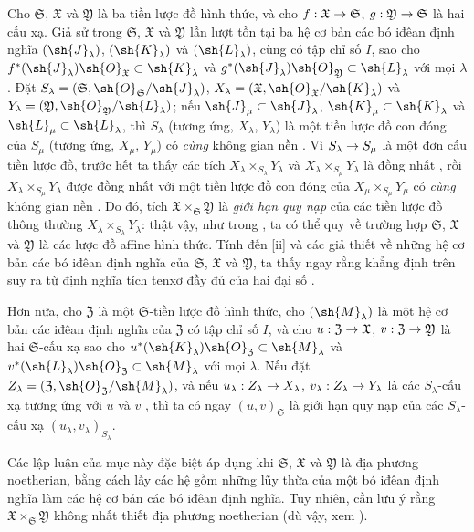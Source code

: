 \documentclass[oneside]{amsart}
\makeatletter
\newcommand{\ega@arrow}[2]{\mathchoice{#1}{#2}{#2}{#2}}
\renewcommand{\to}{\ega@arrow{\longrightarrow}{\rightarrow}}
\newcommand{\oldpage}[2][]{{\marginnote{\normalfont\textbf{#1}~|~#2}}\ignorespaces}
\let\EGAOriginalLabel\label
\renewcommand{\label}[1]{\phantomsection\EGAOriginalLabel{#1}}
\makeatother
\begin{document}
\begin{env}[10.7.4]
\label{I.10.7.4}
Cho $\mathfrak{S}$, $\mathfrak{X}$ và $\mathfrak{Y}$ là ba tiền lược đồ hình thức, và cho $f:\mathfrak{X}\to\mathfrak{S}$, $g:\mathfrak{Y}\to\mathfrak{S}$ là hai cấu xạ.
Giả sử trong $\mathfrak{S}$, $\mathfrak{X}$ và $\mathfrak{Y}$ lần lượt tồn tại ba hệ cơ bản các bó iđêan định nghĩa $(\sh{J}_\lambda)$, $(\sh{K}_\lambda)$ và $(\sh{L}_\lambda)$, cùng có tập chỉ số $I$, sao cho $f^*(\sh{J}_\lambda)\sh{O}_\mathfrak{X}\subset\sh{K}_\lambda$ và $g^*(\sh{J}_\lambda)\sh{O}_\mathfrak{Y}\subset\sh{L}_\lambda$ với mọi $\lambda$.
Đặt $S_\lambda=(\mathfrak{S},\sh{O}_\mathfrak{S}/\sh{J}_\lambda)$, $X_\lambda=(\mathfrak{X},\sh{O}_\mathfrak{X}/\sh{K}_\lambda)$ và $Y_\lambda=(\mathfrak{Y},\sh{O}_\mathfrak{Y}/\sh{L}_\lambda)$; nếu $\sh{J}_\mu\subset\sh{J}_\lambda$, $\sh{K}_\mu\subset\sh{K}_\lambda$ và $\sh{L}_\mu\subset\sh{L}_\lambda$, thì $S_\lambda$ (tương ứng, $X_\lambda$, $Y_\lambda$) là một tiền lược đồ con đóng của $S_\mu$ (tương ứng, $X_\mu$, $Y_\mu$) có \emph{cùng}
\oldpage[I]{194}
không gian nền .
Vì $S_\lambda\to S_\mu$ là một đơn cấu tiền lược đồ, trước hết ta thấy các tích $X_\lambda\times_{S_\lambda}Y_\lambda$ và $X_\lambda\times_{S_\mu}Y_\lambda$ là đồng nhất , rồi $X_\lambda\times_{S_\mu}Y_\lambda$ được đồng nhất với một tiền lược đồ con đóng của $X_\mu\times_{S_\mu}Y_\mu$ có \emph{cùng} không gian nền .
Do đó, tích $\mathfrak{X}\times_\mathfrak{S}\mathfrak{Y}$ là \emph{giới hạn quy nạp} của các tiền lược đồ thông thường $X_\lambda\times_{S_\lambda}Y_\lambda$: thật vậy, như trong , ta có thể quy về trường hợp $\mathfrak{S}$, $\mathfrak{X}$ và $\mathfrak{Y}$ là các lược đồ affine hình thức.
Tính đến [ii] và các giả thiết về những hệ cơ bản các bó iđêan định nghĩa của $\mathfrak{S}$, $\mathfrak{X}$ và $\mathfrak{Y}$, ta thấy ngay rằng khẳng định trên suy ra từ định nghĩa tích tenxơ đầy đủ của hai đại số .

Hơn nữa, cho $\mathfrak{Z}$ là một $\mathfrak{S}$-tiền lược đồ hình thức, cho $(\sh{M}_\lambda)$ là một hệ cơ bản các iđêan định nghĩa của $\mathfrak{Z}$ có tập chỉ số $I$, và cho $u:\mathfrak{Z}\to\mathfrak{X}$, $v:\mathfrak{Z}\to\mathfrak{Y}$ là hai $\mathfrak{S}$-cấu xạ sao cho $u^*(\sh{K}_\lambda)\sh{O}_\mathfrak{Z}\subset\sh{M}_\lambda$ và $v^*(\sh{L}_\lambda)\sh{O}_\mathfrak{Z}\subset\sh{M}_\lambda$ với mọi $\lambda$.
Nếu đặt $Z_\lambda=(\mathfrak{Z},\sh{O}_\mathfrak{Z}/\sh{M}_\lambda)$, và nếu $u_\lambda:Z_\lambda\to X_\lambda$, $v_\lambda:Z_\lambda\to Y_\lambda$ là các $S_\lambda$-cấu xạ tương ứng với $u$ và $v$ , thì ta có ngay $(u,v)_\mathfrak{S}$ là giới hạn quy nạp của các $S_\lambda$-cấu xạ $(u_\lambda,v_\lambda)_{S_\lambda}$.

Các lập luận của mục này đặc biệt áp dụng khi $\mathfrak{S}$, $\mathfrak{X}$ và $\mathfrak{Y}$ là địa phương noetherian, bằng cách lấy các hệ gồm những lũy thừa của một bó iđêan định nghĩa  làm các hệ cơ bản các bó iđêan định nghĩa.
Tuy nhiên, cần lưu ý rằng $\mathfrak{X}\times_\mathfrak{S}\mathfrak{Y}$ không nhất thiết địa phương noetherian (dù vậy, xem ).
\end{env}
\end{document}
